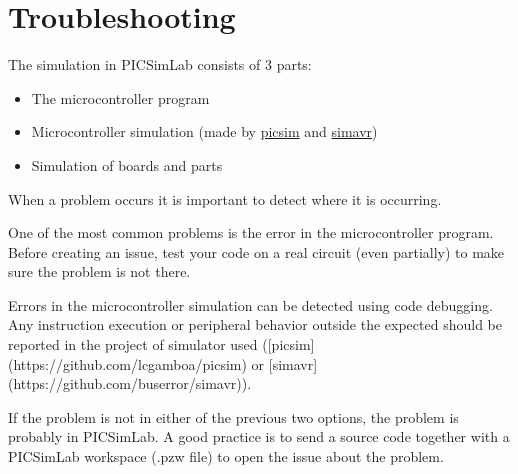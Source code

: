 
\chapter{Troubleshooting}

The simulation in PICSimLab consists of 3 parts:

\begin{itemize}
 \item The microcontroller program
 \item Microcontroller simulation (made by \href{https://github.com/lcgamboa/picsim}{picsim} and \href{https://github.com/buserror/simavr}{simavr})
 \item Simulation of boards and parts
\end{itemize}


When a problem occurs it is important to detect where it is occurring.

One of the most common problems is the error in the microcontroller program. Before creating an issue, test your code on a real circuit (even partially) to make sure the problem is not there.

Errors in the microcontroller simulation can be detected using code debugging. Any instruction execution or peripheral behavior outside the expected should be reported in the project of simulator used ([picsim](https://github.com/lcgamboa/picsim) or [simavr](https://github.com/buserror/simavr)).

If the problem is not in either of the previous two options, the problem is probably in PICSimLab. A good practice is to send a source code together with a PICSimLab workspace (.pzw file) to open the issue about the problem.

